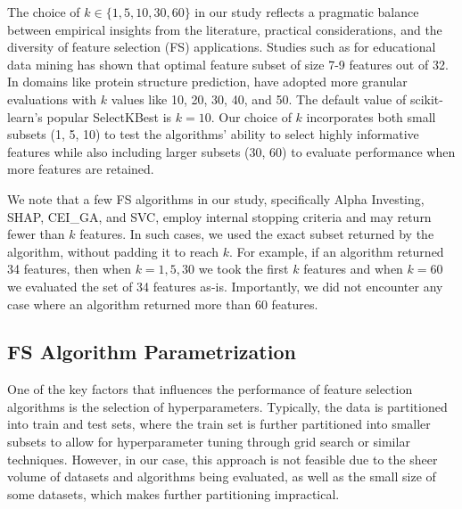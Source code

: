 \documentclass[preprint,12pt,authoryear]{elsarticle}
\begin{document}

The choice of $k \in \{1, 5, 10, 30, 60 \}$ in our study reflects a pragmatic balance between empirical insights from the literature, practical considerations, and the diversity of feature selection (FS) applications. Studies such as \cite{bertolini2021enhancing} for educational data mining has shown that optimal feature subset of size 7-9 features out of 32. In domains like protein structure prediction, \cite{Yi_2022}  have adopted more granular evaluations with \(k\) values like 10, 20, 30, 40, and 50. The default value of scikit-learn's popular SelectKBest is $k=10$. Our choice of \(k\) incorporates both small subsets (1, 5, 10) to test the algorithms' ability to select highly informative features while also including larger subsets (30, 60) to evaluate performance when more features are retained. 



We note that a few FS algorithms in our study, specifically Alpha Investing, SHAP, CEI\_GA, and SVC, employ internal stopping criteria and may return fewer than $k$ features. In such cases, we used the exact subset returned by the algorithm, without padding it to reach $k$. For example, if an algorithm returned 34 features, then when $k=1,5,30$ we took the first $k$ features and when $k=60$ we evaluated the set of 34 features as-is. Importantly, we did not encounter any case where an algorithm returned more than 60 features.

\subsection{FS Algorithm Parametrization}
One of the key factors that influences the performance of feature selection algorithms is the selection of hyperparameters. Typically, the data is partitioned into train and test sets, where the train set is further partitioned into smaller subsets to allow for hyperparameter tuning through grid search or similar techniques. However, in our case, this approach is not feasible due to the sheer volume of datasets and algorithms being evaluated, as well as the small size of some datasets, which makes further partitioning impractical. 
\end{document}
